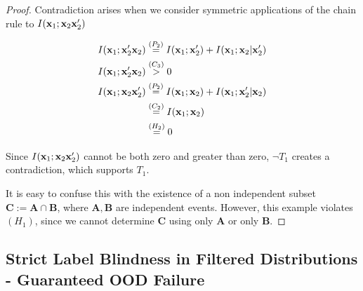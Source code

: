 \begin{lemma}
\begin{proof}
Contradiction arises when we consider symmetric applications of the chain rule to $I({\mathbf{x}}_1;{\mathbf{x}}_2 {\mathbf{x}}_2')$

$$
\begin{aligned}
I({\mathbf{x}}_1;{\mathbf{x}}_2' {\mathbf{x}}_2) &\stackrel{\left(P_2\right)}{=} I({\mathbf{x}}_1;{\mathbf{x}}_2') + I({\mathbf{x}}_1;{\mathbf{x}}_2|{\mathbf{x}}_2') \\
I({\mathbf{x}}_1;{\mathbf{x}}_2' {\mathbf{x}}_2) &\stackrel{\left(C_3\right)}{>} 0 \\
I({\mathbf{x}}_1;{\mathbf{x}}_2 {\mathbf{x}}_2') &\stackrel{\left(P_2\right)}{=} I({\mathbf{x}}_1;{\mathbf{x}}_2) + I({\mathbf{x}}_1;{\mathbf{x}}_2'|{\mathbf{x}}_2) \\
&\stackrel{\left(C_2\right)}{=} I({\mathbf{x}}_1;{\mathbf{x}}_2)\\
&\stackrel{\left(H_2\right)}{=} 0 \\
\end{aligned}
$$

Since $I({\mathbf{x}}_1;{\mathbf{x}}_2 {\mathbf{x}}_2')$ cannot be both zero and greater than zero, $\neg T_1$ creates a contradiction, which supports $T_1$.

It is easy to confuse this with the existence of a non independent subset $\mathbf{C} := \mathbf{A \cap B}$,  where $\mathbf{A}, \mathbf{B}$ are independent events. However, this example violates $(H_1)$, since we cannot determine $\mathbf{C}$ using only $\mathbf{A}$ or only $\mathbf{B}$.

\end{proof}
\label{filter}
\end{lemma}

\subsection{Strict Label Blindness in Filtered Distributions - Guaranteed OOD Failure}
\label{app:failood}

